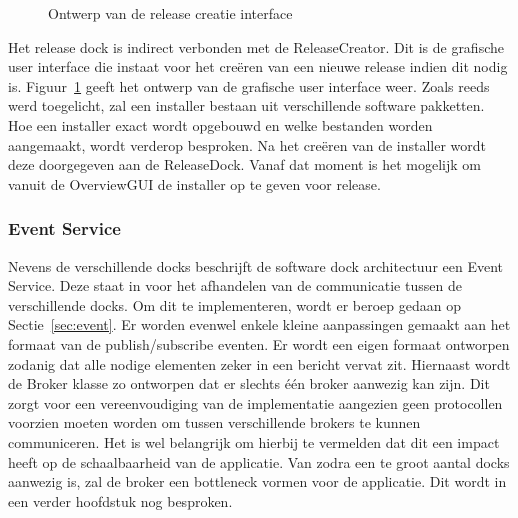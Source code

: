 \begin{figure}[!ht]
\centering
{}
\caption{Ontwerp van de release creatie interface}
\label{fig:releaseCreator}
\end{figure}

Het release dock is indirect verbonden met de ReleaseCreator.
Dit is de grafische user interface die instaat voor het creëren van een nieuwe release indien dit nodig is.
Figuur~\ref{fig:releaseCreator} geeft het ontwerp van de grafische user interface weer.
Zoals reeds werd toegelicht, zal een installer bestaan uit verschillende software pakketten.
Hoe een installer exact wordt opgebouwd en welke bestanden worden aangemaakt, wordt verderop besproken.
Na het creëren van de installer wordt deze doorgegeven aan de ReleaseDock.
Vanaf dat moment is het mogelijk om vanuit de OverviewGUI de installer op te geven voor release.

\subsubsection{Event Service}
Nevens de verschillende docks beschrijft de software dock architectuur een Event Service.
Deze staat in voor het afhandelen van de communicatie tussen de verschillende docks.
Om dit te implementeren, wordt er beroep gedaan op Sectie~\vref{sec:event}.
Er worden evenwel enkele kleine aanpassingen gemaakt aan het formaat van de publish/subscribe eventen.
Er wordt een eigen formaat ontworpen zodanig dat alle nodige elementen zeker in een bericht vervat zit.
Hiernaast wordt de Broker klasse zo ontworpen dat er slechts één broker aanwezig kan zijn.
Dit zorgt voor een vereenvoudiging van de implementatie aangezien geen protocollen voorzien moeten worden om tussen verschillende brokers te kunnen communiceren.
Het is wel belangrijk om hierbij te vermelden dat dit een impact heeft op de schaalbaarheid van de applicatie.
Van zodra een te groot aantal docks aanwezig is, zal de broker een bottleneck vormen voor de applicatie.
Dit wordt in een verder hoofdstuk nog besproken.

